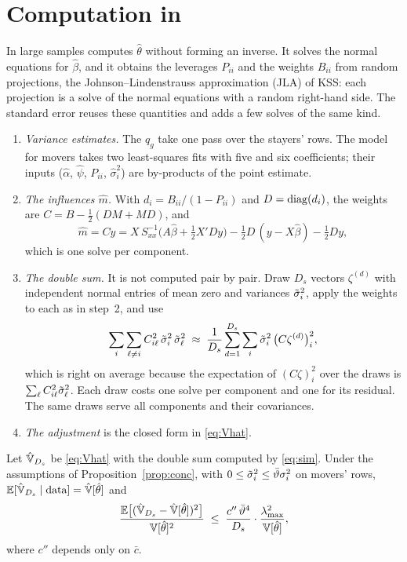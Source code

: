 \section{Computation in \fevc{}}\label{sec:computation}

In large samples \fevc{} computes $\hat\theta$ without forming an inverse. It solves the normal equations for
$\hat\beta$, and it obtains the leverages $P_{ii}$ and the weights $B_{ii}$ from random projections, the
Johnson--Lindenstrauss approximation (JLA) of KSS: each projection is a solve of the normal equations with a
random right-hand side. The standard error reuses these quantities and adds a few solves of the same kind.

\begin{enumerate}
\item \emph{Variance estimates.} The $q_g$ take one pass over the stayers' rows. The model for movers takes two
least-squares fits with five and six coefficients; their inputs ($\hat\alpha$, $\hat\psi$, $P_{ii}$,
$\hat\sigma_i^2$) are by-products of the point estimate.
\item \emph{The influences $\hat m$.} With $d_i=B_{ii}/(1-P_{ii})$ and $D=\operatorname{diag}(d_i)$, the weights are
$C=B-\frac12(DM+MD)$, and
\[
\hat m=Cy=X\,S_{xx}^{-1}\big(A\hat\beta+\tfrac12X'Dy\big)-\tfrac12D\,(y-X\hat\beta)-\tfrac12Dy ,
\]
which is one solve per component.
\item \emph{The double sum.} It is not computed pair by pair. Draw $D_s$ vectors $\zeta^{(d)}$ with
independent normal entries of mean zero and variances $\tilde\sigma_i^2$, apply the weights to each as in step~2, and
use
\begin{equation}\label{eq:sim}
\sum_i\sum_{\ell\ne i}C_{i\ell}^2\,\tilde\sigma_i^2\,\tilde\sigma_\ell^2\;\approx\;
\frac{1}{D_s}\sum_{d=1}^{D_s}\sum_i\tilde\sigma_i^2\,\big(C\zeta^{(d)}\big)_i^{2} ,
\end{equation}
which is right on average because the expectation of $(C\zeta)_i^2$ over the draws is
$\sum_\ell C_{i\ell}^2\tilde\sigma_\ell^2$. Each draw costs one solve per component and one for its residual. The same
draws serve all components and their covariances.
\item \emph{The adjustment} is the closed form in \eqref{eq:Vhat}.
\end{enumerate}

\begin{proposition}\label{prop:sim}
Let $\hat{\mathbb{V}}_{D_s}$ be \eqref{eq:Vhat} with the double sum computed by \eqref{eq:sim}. Under the assumptions of
Proposition~\ref{prop:conc}, with $0\le\tilde\sigma_i^2\le\bar\vartheta\sigma_i^2$ on movers' rows,
$\mathbb{E}[\hat{\mathbb{V}}_{D_s}\mid\text{data}]=\hat{\mathbb{V}}[\hat\theta]$ and
\[
\frac{\mathbb{E}\big[(\hat{\mathbb{V}}_{D_s}-\hat{\mathbb{V}}[\hat\theta])^2\big]}{\mathbb{V}[\hat\theta]^2}\;\le\;\frac{c''\,\bar\vartheta^4}{D_s}\cdot\frac{\lambda_{\max}^2}{\mathbb{V}[\hat\theta]} ,
\]
where $c''$ depends only on $\bar c$.
\end{proposition}

